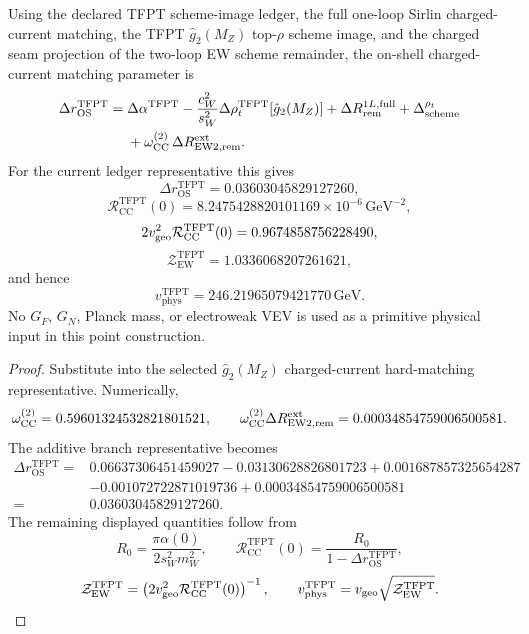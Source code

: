 \begin{theorem}
\label{thm:charged-current-point-closure}
Using the declared TFPT scheme-image ledger, the full one-loop Sirlin charged-current matching, the
TFPT $\hat g_2(M_Z)$ top-$\rho$ scheme image, and the charged seam projection of the two-loop EW
scheme remainder, the on-shell charged-current matching parameter is
\begin{equation}
\label{eq:tfpt-point-closed-deltar}
\begin{aligned}
\Delta r_{\mathrm{OS}}^{\mathrm{TFPT}}
={}&
\Delta\alpha^{\mathrm{TFPT}}
-
\frac{c_W^2}{s_W^2}\Delta\rho_t^{\mathrm{TFPT}}[\hat g_2(M_Z)]
+
\Delta R_{\mathrm{rem}}^{1L,\mathrm{full}}
+
\Delta_{\mathrm{scheme}}^{\rho_t}
\\
&+
\omega_{\mathrm{CC}}^{(2)}\,
\Delta R_{\mathrm{EW2},\mathrm{rem}}^{\mathrm{ext}}.
\end{aligned}
\end{equation}
For the current ledger representative this gives
\[
\Delta r_{\mathrm{OS}}^{\mathrm{TFPT}}
=
0.03603045829127260,
\]
\[
\mathcal R_{\mathrm{CC}}^{\mathrm{TFPT}}(0)
=
8.2475428820101169\times10^{-6}\,\mathrm{GeV}^{-2},
\]
\[
2v_{\mathrm{geo}}^2\mathcal R_{\mathrm{CC}}^{\mathrm{TFPT}}(0)
=
0.9674858756228490,
\]
\[
\mathcal Z_{\mathrm{EW}}^{\mathrm{TFPT}}
=
1.0336068207261621,
\]
and hence
\[
v_{\mathrm{phys}}^{\mathrm{TFPT}}
=
246.21965079421770\,\mathrm{GeV}.
\]
No $G_F$, $G_N$, Planck mass, or electroweak VEV is used as a primitive physical input in this point
construction.
\end{theorem}

\begin{proof}
Substitute  into the selected $\hat g_2(M_Z)$ charged-current
hard-matching representative. Numerically,
\[
\omega_{\mathrm{CC}}^{(2)}=0.59601324532821801521,
\qquad
\omega_{\mathrm{CC}}^{(2)}\Delta R_{\mathrm{EW2},\mathrm{rem}}^{\mathrm{ext}}
=
0.00034854759006500581.
\]
The additive branch representative becomes
\[
\begin{aligned}
\Delta r_{\mathrm{OS}}^{\mathrm{TFPT}}
={}&
0.06637306451459027
-0.03130628826801723
+0.001687857325654287
\\
&-0.001072722871019736
+0.00034854759006500581
\\
={}&
0.03603045829127260.
\end{aligned}
\]
The remaining displayed quantities follow from
\[
R_0=\frac{\pi\alpha(0)}{2s_W^2m_W^2},
\qquad
\mathcal R_{\mathrm{CC}}^{\mathrm{TFPT}}(0)=\frac{R_0}{1-\Delta r_{\mathrm{OS}}^{\mathrm{TFPT}}},
\]
\[
\mathcal Z_{\mathrm{EW}}^{\mathrm{TFPT}}
=
\left(2v_{\mathrm{geo}}^2\mathcal R_{\mathrm{CC}}^{\mathrm{TFPT}}(0)\right)^{-1},
\qquad
v_{\mathrm{phys}}^{\mathrm{TFPT}}
=
v_{\mathrm{geo}}\sqrt{\mathcal Z_{\mathrm{EW}}^{\mathrm{TFPT}}}.
\]
\end{proof}

